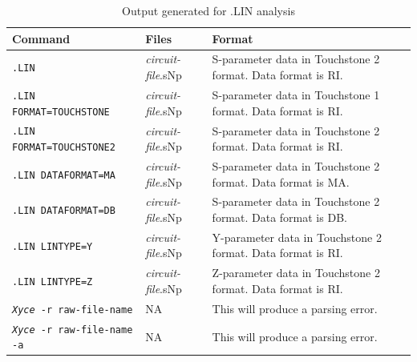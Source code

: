 \begin{table}[htbp]
  \caption{Output generated for .LIN analysis \label{LIN_Output_table}}
  \begin{tabularx}{\linewidth}{|p{2.75in}|Y|Y|}
     \color{white}\textbf{Command} & \color{white}\textbf{Files} & \color{white}\textbf{Format} \\ \hline
\texttt{.LIN} & \emph{circuit-file}.sNp & S-parameter data in Touchstone 2 format. Data format is RI. \\ \hline
\texttt{.LIN FORMAT=TOUCHSTONE} & \emph{circuit-file}.sNp & S-parameter data in Touchstone 1 format. Data format is RI. \\ \hline
\texttt{.LIN FORMAT=TOUCHSTONE2} & \emph{circuit-file}.sNp & S-parameter data in Touchstone 2 format. Data format is RI. \\ \hline
\texttt{.LIN DATAFORMAT=MA} & \emph{circuit-file}.sNp & S-parameter data in Touchstone 2 format. Data format is MA. \\ \hline
\texttt{.LIN DATAFORMAT=DB} & \emph{circuit-file}.sNp & S-parameter data in Touchstone 2 format. Data format is DB. \\ \hline
\texttt{.LIN LINTYPE=Y} & \emph{circuit-file}.sNp & Y-parameter data in Touchstone 2 format. Data format is RI. \\ \hline
\texttt{.LIN LINTYPE=Z} & \emph{circuit-file}.sNp & Z-parameter data in Touchstone 2 format. Data format is RI. \\ \hline

\texttt{\emph{Xyce} -r raw-file-name} & NA & This will produce a parsing error. \\ \hline
\texttt{\emph{Xyce} -r raw-file-name -a} & NA & This will produce a parsing error. \\ \hline

\end{tabularx}
\end{table}

